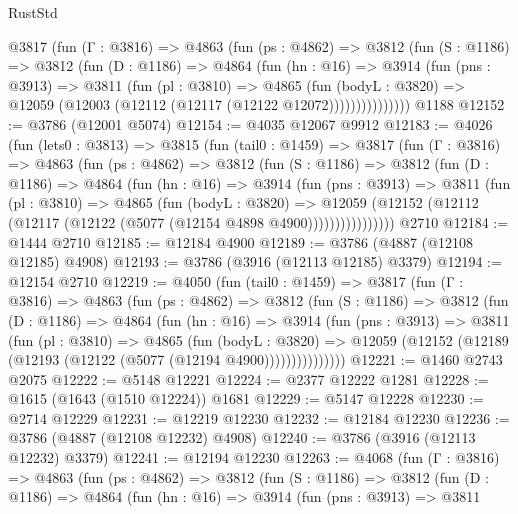 \begin{lexlean}{RustStd}
\begin{coremodule}
        @3817
          (fun (Γ : @3816) =>
          @4863
            (fun (ps : @4862) =>
            @3812
              (fun (S : @1186) =>
              @3812
                (fun (D : @1186) =>
                @4864
                  (fun (hn : @16) =>
                  @3914
                    (fun (pns : @3913) =>
                    @3811
                      (fun (pl : @3810) =>
                      @4865
                        (fun (bodyL : @3820) =>
                        @12059 (@12003 (@12112 (@12117 (@12122 @12072)))))))))))))))
    @1188
@12152 := @3786 (@12001 @5074)
@12154 := @4035 @12067 @9912
@12183 := @4026
    (fun (lets0 : @3813) =>
    @3815
      (fun (tail0 : @1459) =>
      @3817
        (fun (Γ : @3816) =>
        @4863
          (fun (ps : @4862) =>
          @3812
            (fun (S : @1186) =>
            @3812
              (fun (D : @1186) =>
              @4864
                (fun (hn : @16) =>
                @3914
                  (fun (pns : @3913) =>
                  @3811
                    (fun (pl : @3810) =>
                    @4865
                      (fun (bodyL : @3820) =>
                      @12059
                        (@12152 (@12112 (@12117 (@12122 (@5077 (@12154 @4898 @4900))))))))))))))))
    @2710
@12184 := @1444 @2710
@12185 := @12184 @4900
@12189 := @3786 (@4887 (@12108 @12185) @4908)
@12193 := @3786 (@3916 (@12113 @12185) @3379)
@12194 := @12154 @2710
@12219 := @4050
    (fun (tail0 : @1459) =>
    @3817
      (fun (Γ : @3816) =>
      @4863
        (fun (ps : @4862) =>
        @3812
          (fun (S : @1186) =>
          @3812
            (fun (D : @1186) =>
            @4864
              (fun (hn : @16) =>
              @3914
                (fun (pns : @3913) =>
                @3811
                  (fun (pl : @3810) =>
                  @4865
                    (fun (bodyL : @3820) =>
                    @12059 (@12152 (@12189 (@12193 (@12122 (@5077 (@12194 @4900)))))))))))))))
@12221 := @1460 @2743 @2075
@12222 := @5148 @12221
@12224 := @2377 @12222 @1281
@12228 := @1615 (@1643 (@1510 @12224)) @1681
@12229 := @5147 @12228
@12230 := @2714 @12229
@12231 := @12219 @12230
@12232 := @12184 @12230
@12236 := @3786 (@4887 (@12108 @12232) @4908)
@12240 := @3786 (@3916 (@12113 @12232) @3379)
@12241 := @12194 @12230
@12263 := @4068
    (fun (Γ : @3816) =>
    @4863
      (fun (ps : @4862) =>
      @3812
        (fun (S : @1186) =>
        @3812
          (fun (D : @1186) =>
          @4864
            (fun (hn : @16) =>
            @3914
              (fun (pns : @3913) =>
              @3811

\end{coremodule}
\end{lexlean}
